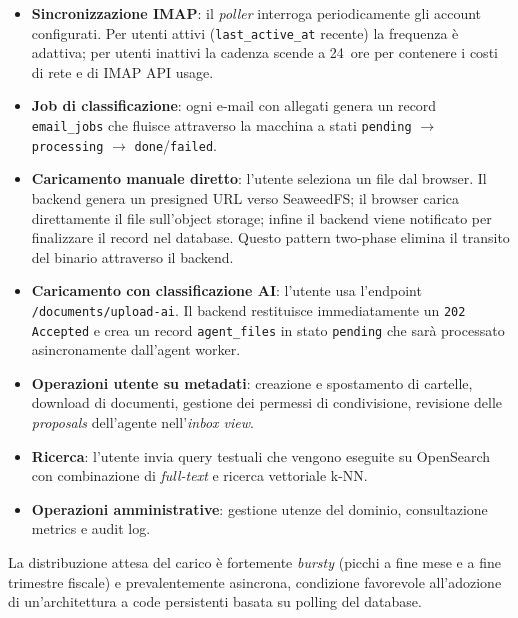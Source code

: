 \begin{itemize}[leftmargin=*]
    \item \textbf{Sincronizzazione IMAP}: il \emph{poller} interroga periodicamente
          gli account configurati. Per utenti attivi (\texttt{last\_active\_at} recente)
          la frequenza \`e adattiva; per utenti inattivi la cadenza scende a 24~ore per
          contenere i costi di rete e di IMAP API usage.

    \item \textbf{Job di classificazione}: ogni e-mail con allegati genera un record
          \texttt{email\_jobs} che fluisce attraverso la macchina a stati
          \texttt{pending} $\rightarrow$ \texttt{processing} $\rightarrow$
          \texttt{done}/\texttt{failed}.

    \item \textbf{Caricamento manuale diretto}: l'utente seleziona un file dal browser.
          Il backend genera un presigned URL verso SeaweedFS; il browser carica direttamente
          il file sull'object storage; infine il backend viene notificato per finalizzare il
          record nel database. Questo pattern two-phase elimina il transito del binario
          attraverso il backend.

    \item \textbf{Caricamento con classificazione AI}: l'utente usa l'endpoint
          \texttt{/documents/upload-ai}. Il backend restituisce immediatamente un
          \texttt{202 Accepted} e crea un record \texttt{agent\_files} in stato
          \texttt{pending} che sar\`a processato asincronamente dall'agent worker.

    \item \textbf{Operazioni utente su metadati}: creazione e spostamento di cartelle,
          download di documenti, gestione dei permessi di condivisione, revisione delle
          \emph{proposals} dell'agente nell'\emph{inbox view}.

    \item \textbf{Ricerca}: l'utente invia query testuali che vengono eseguite su
          OpenSearch con combinazione di \emph{full-text} e ricerca vettoriale k-NN.

    \item \textbf{Operazioni amministrative}: gestione utenze del dominio,
          consultazione metrics e audit log.
\end{itemize}

La distribuzione attesa del carico \`e fortemente \emph{bursty} (picchi a fine mese
e a fine trimestre fiscale) e prevalentemente asincrona, condizione favorevole
all'adozione di un'architettura a code persistenti basata su polling del database.

